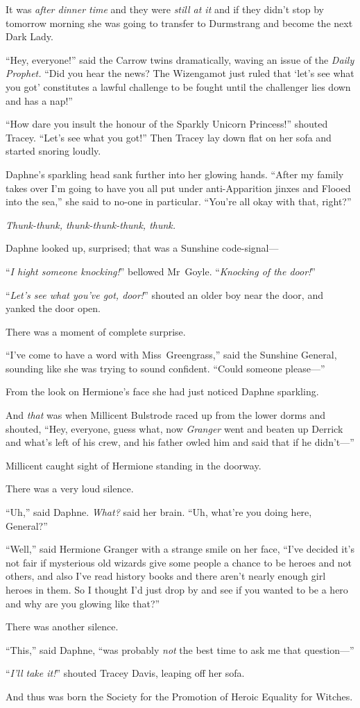 It was \emph{after dinner time} and they were \emph{still at it} and if they didn’t stop by tomorrow morning she was going to transfer to Durmstrang and become the next Dark Lady.

“Hey, everyone!” said the Carrow twins dramatically, waving an issue of the \emph{Daily Prophet.} “Did you hear the news? The Wizengamot just ruled that ‘let’s see what you got’ constitutes a lawful challenge to be fought until the challenger lies down and has a nap!”

“How dare you insult the honour of the Sparkly Unicorn Princess!” shouted Tracey. “Let’s see what you got!” Then Tracey lay down flat on her sofa and started snoring loudly.

Daphne’s sparkling head sank further into her glowing hands. “After my family takes over I’m going to have you all put under anti-Apparition jinxes and Flooed into the sea,” she said to no-one in particular. “You’re all okay with that, right?”

\emph{Thunk-thunk, thunk-thunk-thunk, thunk.}

Daphne looked up, surprised; that was a Sunshine code-signal—

“\emph{I hight someone knocking!}” bellowed Mr~Goyle. “\emph{Knocking of the door!}”

“\emph{Let’s see what you’ve got, door!}” shouted an older boy near the door, and yanked the door open.

There was a moment of complete surprise.

“I’ve come to have a word with Miss~Greengrass,” said the Sunshine General, sounding like she was trying to sound confident. “Could someone please—”

From the look on Hermione’s face she had just noticed Daphne sparkling.

And \emph{that} was when Millicent Bulstrode raced up from the lower dorms and shouted, “Hey, everyone, guess what, now \emph{Granger} went and beaten up Derrick and what’s left of his crew, and his father owled him and said that if he didn’t—”

Millicent caught sight of Hermione standing in the doorway.

There was a very loud silence.

“Uh,” said Daphne. \emph{What?} said her brain. “Uh, what’re you doing here, General?”

“Well,” said Hermione Granger with a strange smile on her face, “I’ve decided it’s not fair if mysterious old wizards give some people a chance to be heroes and not others, and also I’ve read history books and there aren’t nearly enough girl heroes in them. So I thought I’d just drop by and see if you wanted to be a hero and why are you glowing like that?”

There was another silence.

“This,” said Daphne, “was probably \emph{not} the best time to ask me that question—”

“\emph{I’ll take it!}” shouted Tracey Davis, leaping off her sofa.

\later

And thus was born the Society for the Promotion of Heroic Equality for Witches.

